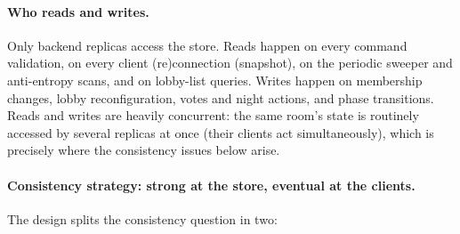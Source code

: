 \documentclass{scrartcl}
\begin{document}
\paragraph{Who reads and writes.}
Only backend replicas access the store. Reads happen on every command
validation, on every client (re)connection (snapshot), on the periodic
sweeper and anti-entropy scans, and on lobby-list queries. Writes happen
on membership changes, lobby reconfiguration, votes and night actions, and
phase transitions. Reads and writes are heavily concurrent: the same
room's state is routinely accessed by several replicas at once (their
clients act simultaneously), which is precisely where the consistency
issues below arise.

\paragraph{Consistency strategy: strong at the store, eventual at the clients.}
The design splits the consistency question in two:
\end{document}
